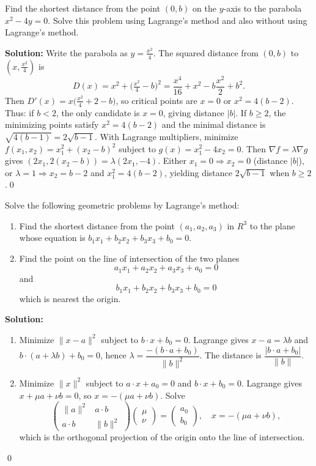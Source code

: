 \begin{problembox}
Find the shortest distance from the point \((0, b)\) on the \( y \)-axis to the parabola \( x^2 - 4y = 0 \). Solve this problem using Lagrange's method and also without using Lagrange's method.
\end{problembox}

\bigskip\noindent\textbf{Solution:}
Write the parabola as $y=\tfrac{x^2}{4}$. The squared distance from $(0,b)$ to $(x,\tfrac{x^2}{4})$ is
\[D(x)=x^2+\Big(\tfrac{x^2}{4}-b\Big)^2=\frac{x^4}{16}+x^2-b\frac{x^2}{2}+b^2.
\]
Then $D'(x)=x\Big(\tfrac{x^2}{4}+2-b\Big)$, so critical points are $x=0$ or $x^2=4(b-2)$. Thus: if $b<2$, the only candidate is $x=0$, giving distance $|b|$. If $b\ge 2$, the minimizing points satisfy $x^2=4(b-2)$ and the minimal distance is $\sqrt{4(b-1)}=2\sqrt{b-1}$.
With Lagrange multipliers, minimize $f(x_1,x_2)=x_1^2+(x_2-b)^2$ subject to $g(x)=x_1^2-4x_2=0$. Then $\nabla f=\lambda\nabla g$ gives $(2x_1,2(x_2-b))=\lambda(2x_1,-4)$. Either $x_1=0\Rightarrow x_2=0$ (distance $|b|$), or $\lambda=1\Rightarrow x_2=b-2$ and $x_1^2=4(b-2)$, yielding distance $2\sqrt{b-1}$ when $b\ge2$.\qed


\begin{problembox}
Solve the following geometric problems by Lagrange's method:
\begin{enumerate}[label=(\alph*)]
    \item Find the shortest distance from the point \((a_1, a_2, a_3)\) in \( R^3 \) to the plane whose equation is \( b_1x_1 + b_2x_2 + b_3x_3 + b_0 = 0 \).
    \item Find the point on the line of intersection of the two planes
    \[a_1x_1 + a_2x_2 + a_3x_3 + a_0 = 0\]
    and
    \[b_1x_1 + b_2x_2 + b_3x_3 + b_0 = 0\]
    which is nearest the origin.
\end{enumerate}
\end{problembox}

\bigskip\noindent\textbf{Solution:}
\begin{enumerate}[label=(\alph*)]
    \item Minimize $\|x-a\|^2$ subject to $b\cdot x+b_0=0$. Lagrange gives $x-a=\lambda b$ and $b\cdot(a+\lambda b)+b_0=0$, hence $\lambda=\dfrac{-(b\cdot a+b_0)}{\|b\|^2}$. The distance is $\dfrac{|b\cdot a+b_0|}{\|b\|}$.
    \item Minimize $\|x\|^2$ subject to $a\cdot x+a_0=0$ and $b\cdot x+b_0=0$. Lagrange gives $x+\mu a+\nu b=0$, so $x=-(\mu a+\nu b)$. Solve
    \[\begin{pmatrix}\|a\|^2 & a\cdot b\\ a\cdot b & \|b\|^2\end{pmatrix}\begin{pmatrix}\mu\\ \nu\end{pmatrix}=\begin{pmatrix}a_0\\ b_0\end{pmatrix},\quad x=-(\mu a+\nu b),\]
    which is the orthogonal projection of the origin onto the line of intersection.
\end{enumerate}\qed


